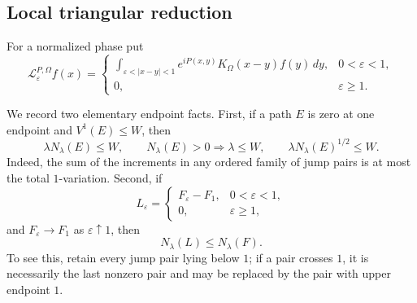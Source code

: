 \documentclass[11pt]{article}
\numberwithin{equation}{section}
\theoremstyle{remark}
\theoremstyle{definition}
\newcommand{\cL}{\mathcal L}
\begin{document}
\subsection{Local triangular reduction}

For a normalized phase put
\begin{equation}\label{eq:strong-local-path}
 \cL^{P,\Omega}_\varepsilon f(x)=
 \begin{cases}
 \displaystyle\int_{\varepsilon<|x-y|<1}
 e^{iP(x,y)}K_\Omega(x-y)f(y)\,dy,&0<\varepsilon<1,\\[1ex]
 0,&\varepsilon\geq1.
 \end{cases}
\end{equation}

We record two elementary endpoint facts.  First, if a path $E$ is zero at
one endpoint and $V^1(E)\leq W$, then
\begin{equation}\label{eq:V1-controls-jump}
 \lambda N_\lambda(E)\leq W,
 \qquad N_\lambda(E)>0\Longrightarrow\lambda\leq W,
 \qquad \lambda N_\lambda(E)^{1/2}\leq W.
\end{equation}
Indeed, the sum of the increments in any ordered family of jump pairs is
at most the total \(1\)-variation.  Second, if
\begin{equation}\label{eq:localized-full-path}
 L_\varepsilon=
 \begin{cases}F_\varepsilon-F_1,&0<\varepsilon<1,\\0,&\varepsilon\geq1,
 \end{cases}
\end{equation}
and $F_\varepsilon\to F_1$ as $\varepsilon\uparrow1$, then
\begin{equation}\label{eq:localized-jump-domination}
 N_\lambda(L)\leq N_\lambda(F).
\end{equation}
To see this, retain every jump pair lying below \(1\); if a pair crosses
\(1\), it is necessarily the last nonzero pair and may be replaced by the
pair with upper endpoint \(1\).
\end{document}
